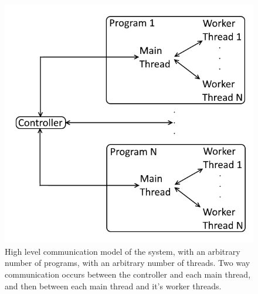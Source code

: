 \begin{figure}
	\centering
	\includegraphics[width=\textwidth]{graphics/communication_structure.png}
	\caption{High level communication model of the system, with an arbitrary number of programs, with an arbitrary number of threads. Two way communication occurs between the controller and each main thread, and then between each main thread and it's worker threads.}
	\label{fig:communication_structure}
\end{figure}


